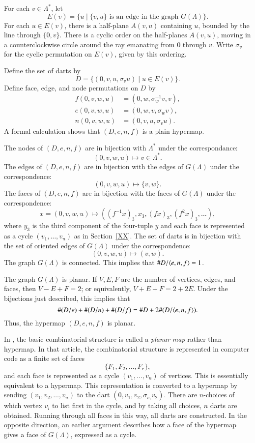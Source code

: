 For each $v\in \Lambda^*$, let 
  $$E(v) = \{u \mid \{v,u\} \text{ is an edge in the graph } G(\Lambda)\}.$$
For each $u\in E(v)$, there is a half-plane $A(v,u)$ containing $u$, bounded by
the line through $\{0,v\}$.  There is a cyclic order on the half-planes $A(v,u)$,
moving in a counterclockwise circle around the ray emanating from $0$ through $v$.
Write $\sigma_v$ for the cyclic permutation on $E(v)$, given by this ordering.

Define the set of darts by
$$
D = \{(0,v,u,\sigma_v u) \mid u\in E(v)\}.
$$
Define face, edge, and node permutations on $D$ by
$$
\begin{array}{lll}
  f(0,v,w,u) &= (0,w,\sigma_w^{-1} v,v),\\
  e(0,v,w,u) &= (0,w,v,\sigma_w v),\\
  n(0,v,w,u) &= (0,v,u,\sigma_v u).
\end{array}
$$
A formal calculation shows that $(D,e,n,f)$ is a plain hypermap.

The nodes of $(D,e,n,f)$ are in bijection with $\Lambda^*$ under the correspondance:
$$
  (0,v,w,u) \mapsto v\in\Lambda^*.
$$
The edges of $(D,e,n,f)$ are in bijection with the edges of $G(\Lambda)$ under the
correspondence:
$$
  (0,v,w,u) \mapsto \{v,w\}.
$$
The faces of $(D,e,n,f)$ are in bijection with the faces of $G(\Lambda)$ under the
correspondence:
$$
  x = (0,v,w,u) \mapsto ((f^{-1}x)_3,x_3,(f x)_3,(f^2 x)_3,\ldots),
$$
where $y_3$ is the third component of the four-tuple $y$ and each face is represented
as a cycle $(v_1,\ldots,v_n)$ as in Section~\ref{XX}.
The set of darts is in bijection with the set of oriented edges of $G(\Lambda)$ under
the correspondence:
$$
(0,v,w,u)\mapsto (v,w).
$$
The graph $G(\Lambda)$ is connected.  This implies that $\# D/\langle e,n,f\rangle = 1$.

The graph $G(\Lambda)$ is planar.  If $V,E,F$ are the number of vertices, edges,
and faces, then $V-E+F=2$; or equivalently, $V+E+F = 2 + 2E$.
Under the bijections just described, this implies that
$$
     \#(D/e) + \#(D/n) + \#(D/f) = \# D + 2\#(D/\langle e,n,f\rangle).
$$
Thus, the hypermap $(D,e,n,f)$ is planar.

In \cite{arx}, the basic combinatorial structure is called a {\it planar map} rather
than hypermap.  In that article, the combinatorial structure is represented in
computer code as a finite set of faces
 $$
  \{F_1,F_2,\ldots,F_r\},
 $$
and each face is represented as a cycle $(v_1,\ldots,v_n)$ of vertices.  This is
essentially equivalent to a hypermap.  This representation
is converted to a hypermap by sending $(v_1,v_2,\ldots,v_n)$ to the dart
$(0,v_1,v_2,\sigma_{v_1} v_2)$.  There are $n$-choices of which vertex $v_i$ to list
first in the cycle, and by taking all choices, $n$ darts are obtained.  Running
through all faces in this way, all darts are constructed.  In the opposite direction,
an earlier argument describes how a face of the hypermap gives a face of $G(\Lambda)$,
expressed as a cycle.


